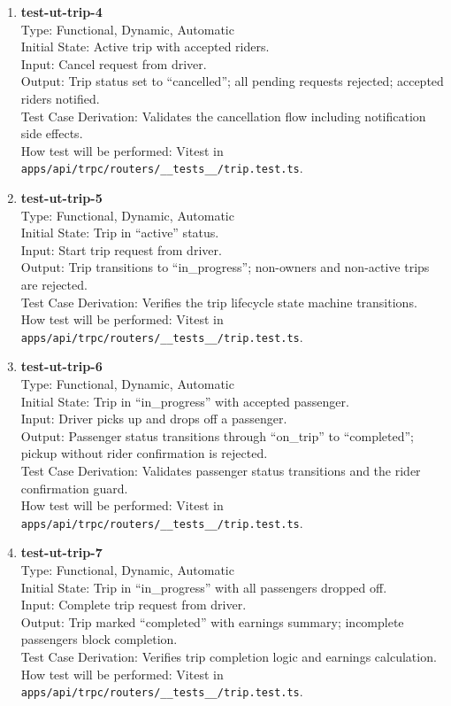 \documentclass[12pt, titlepage]{article}
\begin{document}
\begin{enumerate}
\item \textbf{test-ut-trip-4}\\
Type: Functional, Dynamic, Automatic\\
Initial State: Active trip with accepted riders.\\
Input: Cancel request from driver.\\
Output: Trip status set to ``cancelled''; all pending requests rejected; accepted riders notified.\\
Test Case Derivation: Validates the cancellation flow including notification side effects.\\
How test will be performed: Vitest in \texttt{apps/api/trpc/routers/\_\_tests\_\_/trip.test.ts}.\\

\item \textbf{test-ut-trip-5}\\
Type: Functional, Dynamic, Automatic\\
Initial State: Trip in ``active'' status.\\
Input: Start trip request from driver.\\
Output: Trip transitions to ``in\_progress''; non-owners and non-active trips are rejected.\\
Test Case Derivation: Verifies the trip lifecycle state machine transitions.\\
How test will be performed: Vitest in \texttt{apps/api/trpc/routers/\_\_tests\_\_/trip.test.ts}.\\

\item \textbf{test-ut-trip-6}\\
Type: Functional, Dynamic, Automatic\\
Initial State: Trip in ``in\_progress'' with accepted passenger.\\
Input: Driver picks up and drops off a passenger.\\
Output: Passenger status transitions through ``on\_trip'' to ``completed''; pickup without rider confirmation is rejected.\\
Test Case Derivation: Validates passenger status transitions and the rider confirmation guard.\\
How test will be performed: Vitest in \texttt{apps/api/trpc/routers/\_\_tests\_\_/trip.test.ts}.\\

\item \textbf{test-ut-trip-7}\\
Type: Functional, Dynamic, Automatic\\
Initial State: Trip in ``in\_progress'' with all passengers dropped off.\\
Input: Complete trip request from driver.\\
Output: Trip marked ``completed'' with earnings summary; incomplete passengers block completion.\\
Test Case Derivation: Verifies trip completion logic and earnings calculation.\\
How test will be performed: Vitest in \texttt{apps/api/trpc/routers/\_\_tests\_\_/trip.test.ts}.\\


\end{enumerate}
\end{document}
